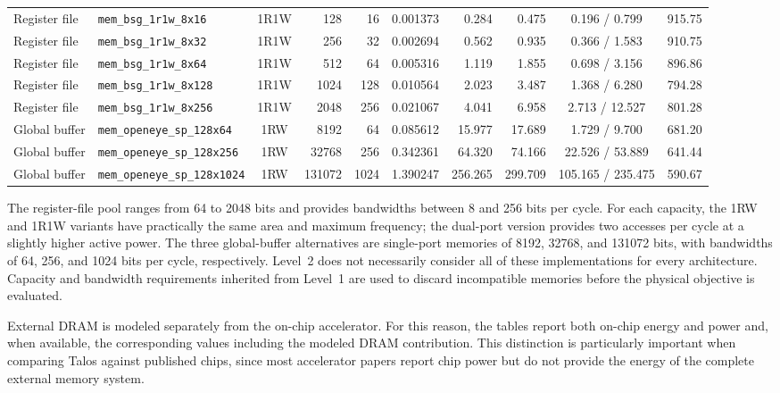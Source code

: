 \begin{table}[t]
{\begin{tabular}{@{}llcrrrrrcr@{}}
Register file &
\texttt{mem\_bsg\_1r1w\_8x16} &
1R1W &
128 &
16 &
0.001373 &
0.284 &
0.475 &
0.196 / 0.799 &
915.75 \\

Register file &
\texttt{mem\_bsg\_1r1w\_8x32} &
1R1W &
256 &
32 &
0.002694 &
0.562 &
0.935 &
0.366 / 1.583 &
910.75 \\

Register file &
\texttt{mem\_bsg\_1r1w\_8x64} &
1R1W &
512 &
64 &
0.005316 &
1.119 &
1.855 &
0.698 / 3.156 &
896.86 \\

Register file &
\texttt{mem\_bsg\_1r1w\_8x128} &
1R1W &
1024 &
128 &
0.010564 &
2.023 &
3.487 &
1.368 / 6.280 &
794.28 \\

Register file &
\texttt{mem\_bsg\_1r1w\_8x256} &
1R1W &
2048 &
256 &
0.021067 &
4.041 &
6.958 &
2.713 / 12.527 &
801.28 \\

\hline

Global buffer &
\texttt{mem\_openeye\_sp\_128x64} &
1RW &
8192 &
64 &
0.085612 &
15.977 &
17.689 &
1.729 / 9.700 &
681.20 \\

Global buffer &
\texttt{mem\_openeye\_sp\_128x256} &
1RW &
32768 &
256 &
0.342361 &
64.320 &
74.166 &
22.526 / 53.889 &
641.44 \\

Global buffer &
\texttt{mem\_openeye\_sp\_128x1024} &
1RW &
131072 &
1024 &
1.390247 &
256.265 &
299.709 &
105.165 / 235.475 &
590.67 \\

\hline
\end{tabular}%
}
\end{table}

The register-file pool ranges from 64 to 2048 bits and provides
bandwidths between 8 and 256 bits per cycle. For each capacity, the
1RW and 1R1W variants have practically the same area and maximum
frequency; the dual-port version provides two accesses per cycle at a
slightly higher active power. The three global-buffer alternatives are
single-port memories of 8192, 32768, and 131072 bits, with bandwidths
of 64, 256, and 1024 bits per cycle, respectively.
Level~2 does not necessarily consider all of these implementations
for every architecture. Capacity and bandwidth requirements inherited
from Level~1 are used to discard incompatible memories before the
physical objective is evaluated.

External DRAM is modeled separately from the on-chip accelerator. For
this reason, the tables report both on-chip energy and power and, when
available, the corresponding values including the modeled DRAM
contribution. This distinction is particularly important when comparing
Talos against published chips, since most accelerator papers report
chip power but do not provide the energy of the complete external
memory system.

